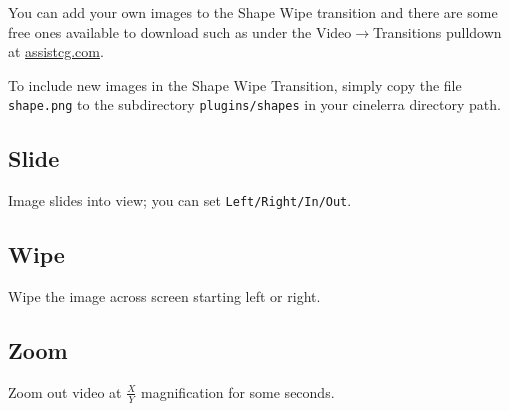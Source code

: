 You can add your own images to the Shape Wipe transition and there are some free ones available to download such as under the Video$\rightarrow$Transitions pulldown at \url{assistcg.com}.

To include new images in the Shape Wipe Transition, simply copy the file \texttt{{shape}.png} to the
 subdirectory \texttt{plugins/shapes} in your cinelerra directory path.

\subsection*{Slide}%
\label{sub:slide}

Image slides into view; you can set \texttt{Left/Right/In/Out}.

\subsection*{Wipe}%
\label{sub:wipe}

Wipe the image across screen starting left or right.

\subsection*{Zoom}%
\label{sub:zoom}

Zoom out video at $\frac{X}{Y}$ magnification for some seconds.

